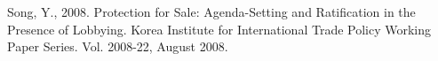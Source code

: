 \documentclass[10pt]{article}
\begin{document}
\begin{list}{}{\setlength{\leftmargin}{0.0in}\setlength{\rightmargin}{0.0in}\setlength{\itemindent}{0.0in}\setlength{\itemsep}{0.1in}}
\item Song, Y., 2008. Protection for Sale: Agenda-Setting and Ratification in the Presence of Lobbying. Korea Institute for International Trade Policy Working Paper Series. Vol. 2008-22, August 2008.



\end{list}
\end{document}
